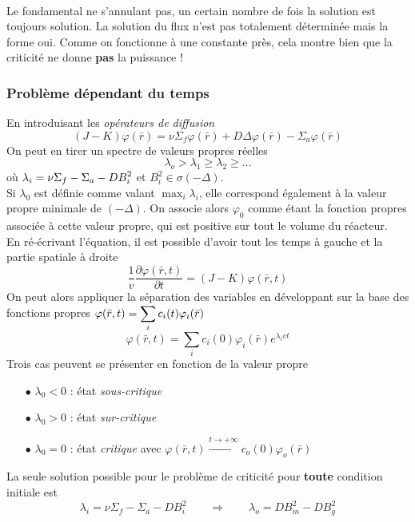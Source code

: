 \ \\

Le fondamental ne s'annulant pas, un certain nombre de fois la solution est toujours solution. La 
solution du flux n'est pas totalement déterminée mais la forme oui. Comme on fonctionne à une 
constante près, cela montre bien que la criticité ne donne \textbf{pas} la puissance ! 


\subsubsection{Problème dépendant du temps}
En introduisant les \textit{opérateurs de diffusion}
\begin{equation}
(J - K)\varphi (\bar r) = \nu {\Sigma _f}\varphi (\bar r) + D\Delta \varphi (\bar r) - {\Sigma _a}\varphi (\bar r)
\end{equation}
On peut en tirer un spectre de valeurs propres réelles
\begin{equation}
{\lambda _o} > {\lambda _1} \ge {\lambda _2} \ge \dots
\end{equation}
où $\displaystyle {\lambda _i} = \nu {\Sigma _f} - {\Sigma _a} - DB_i^2$ et $B_i^2 \in \sigma ( - \Delta )$. \\

Si $\lambda_0$ est définie comme valant $\max_i\lambda_i$, elle correspond également à la valeur 
propre minimale de $(-\Delta)$. On associe alors $\varphi_0$ comme étant la fonction propres associée
à cette valeur propre, qui est positive sur tout le volume du réacteur.\\

En ré-écrivant l'équation, il est possible d'avoir tout les temps à gauche et la partie spatiale à 
droite 
\begin{equation}
\frac{1}{v}\frac{{\partial \varphi (\bar r,t)}}{{\partial t}} = (J - K)\varphi (\bar r,t)
\end{equation}
On peut alors appliquer la séparation des variables en développant sur la base des fonctions 
propres $\displaystyle \varphi (\bar r,t) = \sum\limits_i    {c_i}(t){\varphi _i}(\bar r)$
\begin{equation}
\varphi (\bar r,t) = \sum\limits_i   {c_i}(0){\varphi _i}(\bar r){e^{{\lambda _i}vt}}
\end{equation}
Trois cas peuvent se présenter en fonction de la valeur propre
\begin{itemize}
\item[$\bullet$] $\lambda_0<0$ : état \textit{sous-critique}
\item[$\bullet$] $\lambda_0>0$ : état \textit{sur-critique}
\item[$\bullet$] $\lambda_0=0$ : état \textit{critique} avec $\varphi (\bar r,t)\overset{t\to+\infty}{\longrightarrow}{c_o}(0){\varphi _o}(\bar r)$
\end{itemize}
La seule solution possible pour le problème de criticité pour \textbf{toute} condition initiale est
\begin{equation}
{\lambda _i} = \nu {\Sigma _f} - {\Sigma _a} - DB_i^2\qquad\Longrightarrow\qquad {\lambda _o} = DB_m^2 - DB_g^2
\end{equation} 

